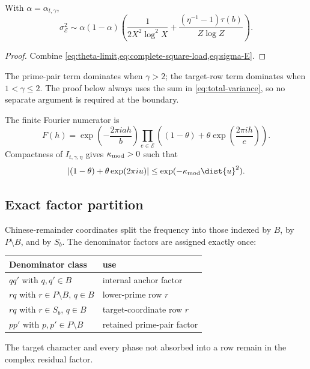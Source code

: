 \begin{proposition}
\label{prop:variance-regimes}
With $\alpha=\alpha_{t,\gamma}$,
\begin{equation}
\label{eq:total-variance}
 \sigma_{\mathcal E}^2\sim\alpha(1-\alpha)
 \left(\frac1{2X^2\log^2X}+\frac{(\eta^{-1}-1)\tau(b)}{Z\log Z}\right).
\end{equation}
\end{proposition}
\begin{proof}
Combine \cref{eq:theta-limit,eq:complete-square-load,eq:sigma-E}.
\end{proof}

The prime-pair term dominates when $\gamma>2$; the target-row term dominates when $1<\gamma\leq2$. The proof below always uses the sum in \cref{eq:total-variance}, so no separate argument is required at the boundary.

The finite Fourier numerator is
\begin{equation}
\label{eq:Fh-definition}
 F(h)=\exp\left(-\frac{2\pi i a h}{b}\right)
 \prod_{e\in\mathcal E}\left((1-\theta)+\theta\exp\left(\frac{2\pi i h}{e}\right)\right).
\end{equation}
Compactness of $I_{t,\gamma,\eta}$ gives $\kappa_{\rm mod}>0$ such that
\begin{equation}
\label{eq:bernoulli-modulus}
 |(1-\theta)+\theta\exp(2\pi i u)|
 \leq\exp(-\kappa_{\rm mod}\dist{u}^2).
\end{equation}

\subsection{Exact factor partition}

Chinese-remainder coordinates split the frequency into those indexed by $B$, by $P\setminus B$, and by $S_b$. The denominator factors are assigned exactly once:
\begin{center}
\begin{tabular}{ll}
\toprule
Denominator class & use \\
\midrule
$q q'$ with $q,q'\in B$ & internal anchor factor \\
$r q$ with $r\in P\setminus B$, $q\in B$ & lower-prime row $r$ \\
$r q$ with $r\in S_b$, $q\in B$ & target-coordinate row $r$ \\
$p p'$ with $p,p'\in P\setminus B$ & retained prime-pair factor \\
\bottomrule
\end{tabular}
\end{center}
The target character and every phase not absorbed into a row remain in the complex residual factor.
